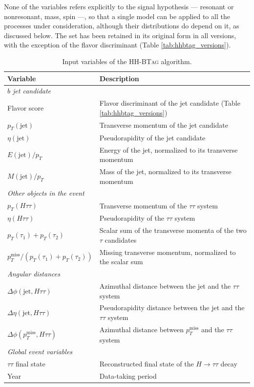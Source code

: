 None of the variables refers explicitly to the signal hypothesis — resonant or nonresonant, mass, spin —, so that a single model can be applied to all the processes under consideration, although their distributions do depend on it, as discussed below. The set has been retained in its original form in all versions, with the exception of the flavor discriminant (Table \ref{tab:hhbtag_versions}).\medskip
%
\begin{table}[t]
\centering
\small
\begin{tabular}{ll}
\toprule
Variable & Description \\
\midrule
\multicolumn{2}{l}{\textit{$b$ jet candidate}} \\
\midrule
Flavor score             & Flavor discriminant of the jet candidate (Table \ref{tab:hhbtag_versions}) \\
$p_T(\mathrm{jet})$      & Transverse momentum of the jet candidate \\
$\eta(\mathrm{jet})$     & Pseudorapidity of the jet candidate \\
$E(\mathrm{jet})/p_T$    & Energy of the jet, normalized to its transverse momentum \\
$M(\mathrm{jet})/p_T$    & Mass of the jet, normalized to its transverse momentum \\
\midrule
\multicolumn{2}{l}{\textit{Other objects in the event}} \\
\midrule
$p_T(H\tau\tau)$         & Transverse momentum of the $\tau\tau$ system \\
$\eta(H\tau\tau)$        & Pseudorapidity of the $\tau\tau$ system \\
$p_T(\tau_1)+p_T(\tau_2)$& Scalar sum of the transverse momenta of the two $\tau$ candidates \\
$p_T^{\mathrm{miss}}/(p_T(\tau_1)+p_T(\tau_2))$ & Missing transverse momentum, normalized to the scalar sum \\
\midrule
\multicolumn{2}{l}{\textit{Angular distances}} \\
\midrule
$\Delta\phi(\mathrm{jet},H\tau\tau)$ & Azimuthal distance between the jet and the $\tau\tau$ system \\
$\Delta\eta(\mathrm{jet},H\tau\tau)$ & Pseudorapidity distance between the jet and the $\tau\tau$ system \\
$\Delta\phi(p_T^{\mathrm{miss}},H\tau\tau)$ & Azimuthal distance between $p_T^{\mathrm{miss}}$ and the $\tau\tau$ system \\
\midrule
\multicolumn{2}{l}{\textit{Global event variables}} \\
\midrule
$\tau\tau$ final state   & Reconstructed final state of the $H\rightarrow\tau\tau$ decay \\
Year                     & Data-taking period \\
\bottomrule
\end{tabular}
\caption{Input variables of the \textsc{HH-BTag} algorithm.}
\label{tab:hhbtag_inputs}
\end{table}

